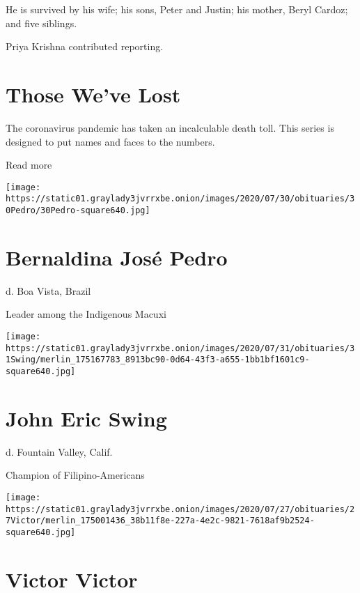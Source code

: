 He is survived by his wife; his sons, Peter and Justin; his mother,
Beryl Cardoz; and five siblings.

Priya Krishna contributed reporting.

\href{https://www.nytimes3xbfgragh.onion/interactive/2020/obituaries/people-died-coronavirus-obituaries.html?action=click\&pgtype=Article\&state=default\&region=BELOW_MAIN_CONTENT\&context=covid_obits_promo}{}

\hypertarget{those-weve-lost}{%
\section{Those We've Lost}\label{those-weve-lost}}

The coronavirus pandemic has taken an incalculable death toll. This
series is designed to put names and faces to the numbers.

Read more

\texttt{[image: https://static01.graylady3jvrrxbe.onion/images/2020/07/30/obituaries/30Pedro/30Pedro-square640.jpg]}

\hypertarget{bernaldina-josuxe9-pedro}{%
\section{Bernaldina José Pedro}\label{bernaldina-josuxe9-pedro}}

d. Boa Vista, Brazil

Leader among the Indigenous Macuxi

\texttt{[image: https://static01.graylady3jvrrxbe.onion/images/2020/07/31/obituaries/31Swing/merlin\_175167783\_8913bc90-0d64-43f3-a655-1bb1bf1601c9-square640.jpg]}

\hypertarget{john-eric-swing}{%
\section{John Eric Swing}\label{john-eric-swing}}

d. Fountain Valley, Calif.

Champion of Filipino-Americans

\texttt{[image: https://static01.graylady3jvrrxbe.onion/images/2020/07/27/obituaries/27Victor/merlin\_175001436\_38b11f8e-227a-4e2c-9821-7618af9b2524-square640.jpg]}

\hypertarget{victor-victor}{%
\section{Victor Victor}\label{victor-victor}}

